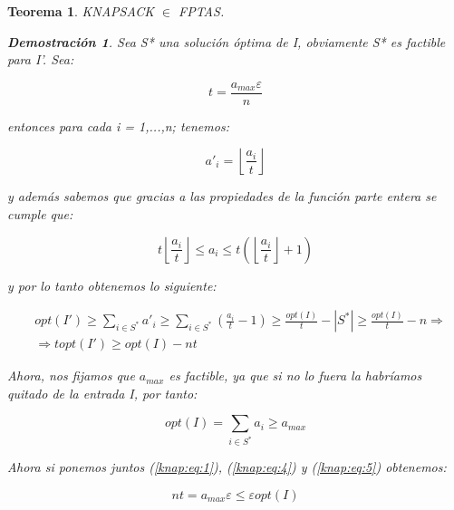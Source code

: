 \documentclass[a4paper,12pt,titlepage]{article}
\newtheorem{teo}{Teorema}[section]
\newtheorem*{dem}{\textbf{Demostraci\'on}}
\begin{document}
\begin{teo}

KNAPSACK $\in$ FPTAS.

\begin{dem}

Sea S* una soluci\'on \'optima de I, obviamente S* es factible para I'. Sea:

\begin{equation} \label{knap:eq:1}
t = \frac{a_{max}\varepsilon}{n}
\end{equation}

entonces para cada i = 1,...,n; tenemos:

\begin{equation} \label{knap:eq:2}
a'_i=\left\lfloor\frac{a_i}{t}\right\rfloor
\end{equation}

y adem\'as sabemos que gracias a las propiedades de la funci\'on parte entera se cumple que:

\begin{equation} \label{knap:eq:3}
t\left\lfloor\frac{a_i}{t}\right\rfloor \leq a_i \leq t(\left\lfloor\frac{a_i}{t}\right\rfloor+1)
\end{equation}

y por lo tanto obtenemos lo siguiente:

\begin{equation} \label{knap:eq:4}
\begin{split}
& opt(I') \geq \sum_{i\in{S^*}}a'_i \geq \sum_{i\in{S^*}}\left(\frac{a_i}{t}-1\right) \geq \frac{opt(I)}{t} - |S^*| \geq \frac{opt(I)}{t} - n \Longrightarrow \\ & \Longrightarrow t{opt}(I') \geq opt(I) - nt
\end{split}
\end{equation}


Ahora, nos fijamos que $a_{max}$ es factible, ya que si no lo fuera la habr\'iamos quitado de la entrada I, por tanto:

\begin{equation} \label{knap:eq:5}
opt(I)=\sum_{i\in{S^*}}a_i \geq a_{max}
\end{equation}

Ahora si ponemos juntos (\ref{knap:eq:1}), (\ref{knap:eq:4}) y (\ref{knap:eq:5}) obtenemos:

\begin{equation} \label{knap:eq:6}
nt = a_{max}\varepsilon \leq \varepsilon{opt(I)}
\end{equation}


\end{dem}
\end{teo}
\end{document}
